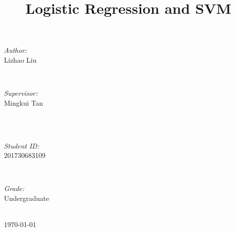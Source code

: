 \documentclass[journal, a4paper]{IEEEtran}
\begin{document}
\begin{titlepage}
\begin{minipage}{0.4\textwidth}
\begin{flushleft} \large
\emph{Author:}\\
Lizhao Liu %
\end{flushleft}
\end{minipage}
~
\begin{minipage}{0.4\textwidth}
\begin{flushright} \large
\emph{Supervisor:} \\
Mingkui Tan %
\end{flushright}
\end{minipage}\\[2cm]
~
\begin{minipage}{0.4\textwidth}
\begin{flushleft} \large
\emph{Student ID:}\\
201730683109
\end{flushleft}
\end{minipage}
~
\begin{minipage}{0.4\textwidth}
\begin{flushright} \large
\emph{Grade:} \\
Undergraduate
\end{flushright}
\end{minipage}\\[2cm]



{\large \today}\\[2cm] %

 

\vfill %

\end{titlepage}

	\title{Logistic Regression and SVM}
	\maketitle
\end{document}
